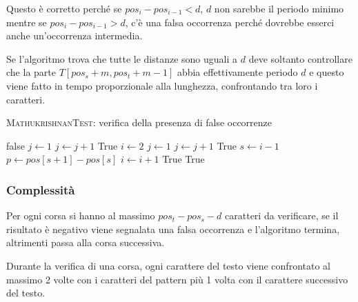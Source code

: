Questo è corretto perché se $ pos_i - pos_{i-1} < d $, $ d $ non sarebbe il periodo minimo mentre se $ pos_i - pos_{i-1} > d $, c'è una falsa occorrenza perché dovrebbe esserci anche un'occorrenza intermedia.

Se l'algoritmo trova che tutte le distanze sono uguali a $ d $ deve soltanto controllare che la parte $ T[pos_s +m, pos_t + m -1] $ abbia effettivamente periodo $ d $ e questo viene fatto in tempo proporzionale alla lunghezza, confrontando tra loro i caratteri.


\begin{breakablealgorithm}
\caption{\textsc{MathukrishnanTest}: verifica della presenza di false occorrenze}
\begin{algorithmic}[1]
		\State \Return false
	\EndIf
	\State $ j \gets 1 $
		\State $ j \gets j+1 $
	\EndWhile
	 
		\State \Return True
	\EndIf
	\State $ i \gets 2 $
		\State $ j \gets 1 $
			\State $ j \gets j+1 $
		\EndWhile
		 
			\State \Return True
		\EndIf
			\State $ s \gets i -1 $
			\State $ p \gets pos[s+1] - pos[s] $
				\State $ i \gets i+1 $
			\EndWhile
				\State \Return True
			\EndIf
		\EndIf
				\State \Return True
			\EndIf
		\EndFor
	\EndWhile
\EndFunction
\end{algorithmic}
\end{breakablealgorithm}

\subsubsection{Complessità}\label{complessituxe0}

Per ogni corsa si hanno al massimo $pos_t - pos_s - d$ caratteri da verificare, se il risultato è negativo viene segnalata una falsa occorrenza e l'algoritmo termina, altrimenti passa alla corsa successiva.

Durante la verifica di una corsa, ogni carattere del testo viene confrontato al massimo 2 volte con i caratteri del pattern più 1 volta con il carattere successivo del testo.

